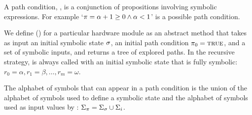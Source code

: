 A path condition, \pathcondition, is a conjunction of propositions involving
symbolic expressions. For example `$\pi = \alpha + 1 \ge 0 \wedge \alpha < 1$' is a
possible path condition.

We define \symexecution() for a particular hardware module as an abstract method
that takes as input an initial symbolic
state $\sigma$, an initial path condition $\pi_0 = \mathtt{\textsc{true}}$, and a
set of symbolic inputs, and 
returns a tree of explored paths. In the recursive strategy, \symexecution{} is
always called with an initial
symbolic state that is fully symbolic: $r_0 = \alpha, r_1 = \beta, \ldots, r_m = \omega$.



The alphabet of symbols that can appear in a path condition is the union of the
alphabet of symbols used to define a symbolic state and the alphabet of symbols
used as input values by \symexecution{}: $\Sigma_{\pi} = \Sigma_{\sigma} \cup \Sigma_i$.







